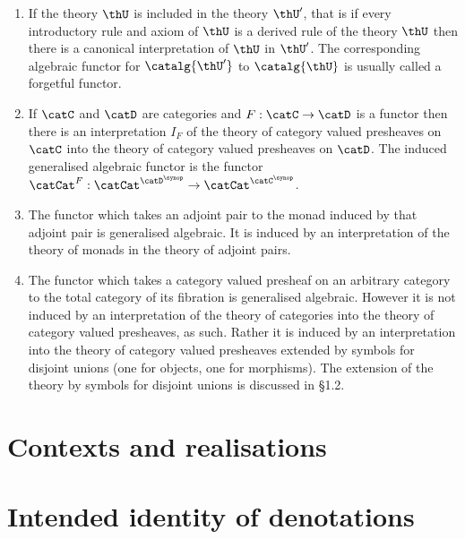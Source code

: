   \begin{examples}

    \begin{enumerate}
      \item If the theory $\thU$ is included in the theory $\thU'$, that is if every introductory rule and axiom of $\thU$ is a derived rule of the theory $\thU$ then there is a canonical interpretation of $\thU$ in $\thU'$.
        The corresponding algebraic functor for $\catalg{\thU'}$ to $\catalg{\thU}$ is usually called a forgetful functor.

      \item If $\catC$ and $\catD$ are categories and $F:\catC\to\catD$ is a functor then there is an interpretation $I_F$ of the theory of category valued presheaves on $\catC$ into the theory of category valued presheaves on $\catD$. The induced generalised algebraic functor is the functor $\catCat^F:\catCat^{\catD^\synop}\to\catCat^{\catC^\synop}$.

      \item The functor which takes an adjoint pair to the monad induced by that adjoint pair is generalised algebraic.
        It is induced by an interpretation of the theory of monads in the theory of adjoint pairs.

      \item The functor which takes a category valued presheaf on an arbitrary category to the total category of its fibration is generalised algebraic.
        However it is not induced by an interpretation of the theory of categories into the theory of category valued presheaves, as such.
        Rather it is induced by an interpretation into the theory of category valued presheaves extended by symbols for disjoint unions (one for objects, one for morphisms).
        The extension of the theory by symbols for disjoint unions is discussed in \S 1.2.
    \end{enumerate}
  \end{examples}

  \section{Contexts and realisations} \label{sec:source-1-12}

  \lipsum[11]

  \section{Intended identity of denotations} \label{sec:source-1-13}

